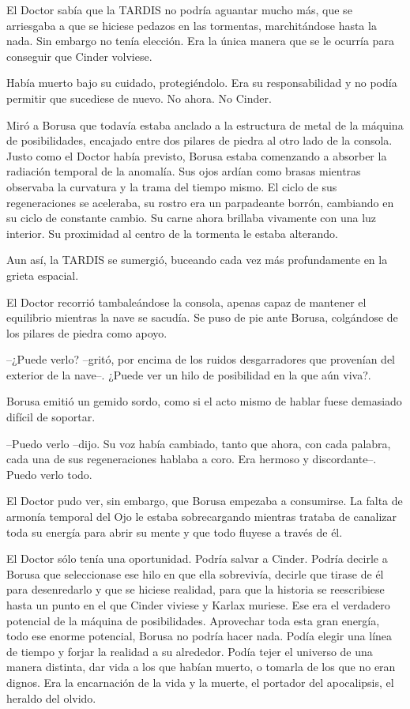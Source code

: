 El Doctor sabía que la TARDIS no podría aguantar mucho más, que se arriesgaba a que se hiciese pedazos en las tormentas, marchitándose hasta la nada. Sin embargo no tenía elección. Era la única manera que se le ocurría para conseguir que Cinder volviese.

Había muerto bajo su cuidado, protegiéndolo. Era su responsabilidad y no podía permitir que sucediese de nuevo. No ahora. No Cinder.

Miró a Borusa que todavía estaba anclado a la estructura de metal de la máquina de posibilidades, encajado entre dos pilares de piedra al otro lado de la consola. Justo como el Doctor había previsto, Borusa estaba comenzando a absorber la radiación temporal de la anomalía. Sus ojos ardían como brasas mientras observaba la curvatura y la trama del tiempo mismo. El ciclo de sus regeneraciones se aceleraba, su rostro era un parpadeante borrón, cambiando en su ciclo de constante cambio. Su carne ahora brillaba vivamente con una luz interior. Su proximidad al centro de la tormenta le estaba alterando.

Aun así, la TARDIS se sumergió, buceando cada vez más profundamente en la grieta espacial.

El Doctor recorrió tambaleándose la consola, apenas capaz de mantener el equilibrio mientras la nave se sacudía. Se puso de pie ante Borusa, colgándose de los pilares de piedra como apoyo. 

--¿Puede verlo? --gritó, por encima de los ruidos desgarradores que provenían del exterior de la nave--. ¿Puede ver un hilo de posibilidad en la que aún viva?.

Borusa emitió un gemido sordo, como si el acto mismo de hablar fuese demasiado difícil de soportar. 

--Puedo verlo --dijo. Su voz había cambiado, tanto que ahora, con cada palabra, cada una de sus regeneraciones hablaba a coro. Era hermoso y discordante--. Puedo verlo todo.

El Doctor pudo ver, sin embargo, que Borusa empezaba a consumirse. La falta de armonía temporal del Ojo le estaba sobrecargando mientras trataba de canalizar toda su energía para abrir su mente y que todo fluyese a través de él.

El Doctor sólo tenía una oportunidad. Podría salvar a Cinder. Podría decirle a Borusa que seleccionase ese hilo en que ella sobrevivía, decirle que tirase de él para desenredarlo y que se hiciese realidad, para que la historia se reescribiese hasta un punto en el que Cinder viviese y Karlax muriese. Ese era el verdadero potencial de la máquina de posibilidades. Aprovechar toda esta gran energía, todo ese enorme potencial, Borusa no podría hacer nada. Podía elegir una línea de tiempo y forjar la realidad a su alrededor. Podía tejer el universo de una manera distinta, dar vida a los que habían muerto, o tomarla de los que no eran dignos. Era la encarnación de la vida y la muerte, el portador del apocalipsis, el heraldo del olvido.

